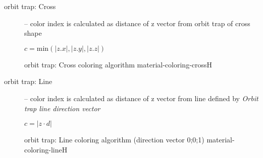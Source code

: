 \begin{description}
\begin{description}
		\item[orbit trap: Cross] -- color index is calculated as distance of z vector from orbit trap of cross shape
		\begin{center}
			\(c = \mathrm{min}(|z.x|, |z.y|, |z.z|)\)
		\end{center}
		{orbit trap: Cross coloring algorithm}
		{material-coloring-cross}{H}
		
		\item[orbit trap: Line] -- color index is calculated as distance of z vector from line defined by \emph{Orbit trap line direction vector}
		\begin{center}
			\(c = |z \cdot d|\)
		\end{center}
		{orbit trap: Line coloring algorithm (direction vector 0;0;1)}
		{material-coloring-line}{H}
	\end{description}
\end{description}









